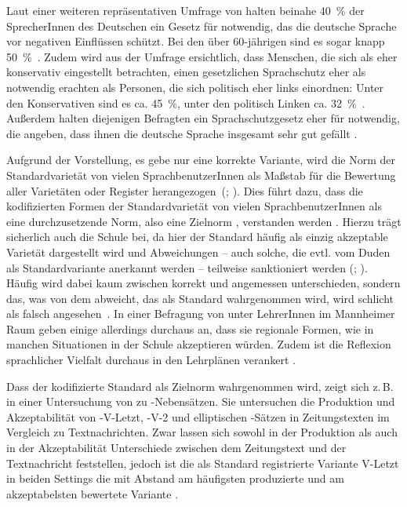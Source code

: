 Laut einer weiteren repräsentativen Umfrage von \citet{Gartig2010} halten beinahe 40~\% der SprecherInnen des Deutschen ein Gesetz f{\"u}r notwendig, das die deutsche Sprache vor negativen Einfl{\"u}ssen sch{\"u}tzt. 
Bei den {\"u}ber 60-j{\"a}hrigen sind es sogar knapp 50~\%~\citep[s.][221]{Gartig2010}. 
Zudem wird aus der Umfrage ersichtlich, dass Menschen, die sich als eher konservativ eingestellt betrachten, einen gesetzlichen Sprachschutz eher als notwendig erachten als Personen, die sich politisch eher links einordnen: 
Unter den Konservativen sind es ca. 45~\%, unter den politisch Linken ca. 32~\%~\citep[s.][221]{Gartig2010}. 
Außerdem halten diejenigen Befragten ein Sprachschutzgesetz eher für notwendig, die angeben, dass ihnen die deutsche Sprache insgesamt sehr gut gefällt \citep[s.][222]{Gartig2010}.

Aufgrund der Vorstellung, es gebe nur eine korrekte Variante, wird die Norm der Standardvariet{\"a}t  von vielen SprachbenutzerInnen als Ma{\ss}stab f{\"u}r die Bewertung aller Variet{\"a}ten oder Register herangezogen~(\citealp[s.][31]{Ammon.2005}; \citealp[133]{Hennig2012}). 
Dies führt dazu, dass die kodifizierten Formen der Standardvarietät von vielen SprachbenutzerInnen als eine durchzusetzende Norm, also eine Zielnorm \citep[s.][21]{Gloy1975}, verstanden werden \citep[s.][31]{Ammon.2005}. 
Hierzu trägt sicherlich auch die Schule bei, da hier der Standard häufig als einzig akzeptable Varietät dargestellt wird und Abweichungen -- auch solche, die evtl. vom Duden als Standardvariante anerkannt werden -- teilweise sanktioniert werden (\citealp[s.][42]{Topalovic2008}; \citealp{Maitz2015}).
Häufig wird dabei kaum zwischen korrekt und angemessen unterschieden, sondern das, was von dem abweicht, das als Standard wahrgenommen wird, wird schlicht als falsch angesehen~\citep[s.][142]{Hennig2012}.
In einer Befragung von \citet{Davies.2000} unter LehrerInnen im Mannheimer Raum geben einige allerdings durchaus an, dass sie regionale Formen, wie  in manchen Situationen in der Schule akzeptieren würden. Zudem ist die Reflexion sprachlicher Vielfalt durchaus in den Lehrplänen verankert \citep[s.][211]{Maitz2015}.

Dass der kodifizierte Standard als Zielnorm wahrgenommen wird, zeigt sich z.\,B. in einer Untersuchung von \citet[]{Wolfer.2020} zu -Nebensätzen.
Sie untersuchen die Produktion und Akzeptabilität von -V-Letzt, -V-2 und elliptischen -Sätzen in Zeitungstexten im Vergleich zu Textnachrichten. 
Zwar lassen sich sowohl in der Produktion als auch in der Akzeptabilität Unterschiede zwischen dem Zeitungstext und der Textnachricht feststellen, jedoch ist die als Standard registrierte Variante V-Letzt in beiden Settings die mit Abstand am häufigsten produzierte und am akzeptabelsten bewertete Variante \citep[s.][185--188]{Wolfer.2020}.
 
